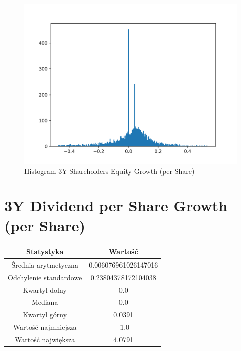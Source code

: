 \documentclass{article}
\begin{document}
\begin{figure}[h!]
    \includegraphics[width=\linewidth]{variables/3Y Shareholders Equity Growth (per Share).png}
    \caption{Histogram 3Y Shareholders Equity Growth (per Share) }
\end{figure}\section{ 3Y Dividend per Share Growth (per Share) }

\begin{center}
    \begin{tabular}{|c | c|} 
    \hline
    Statystyka & Wartość \\
    \hline\hline
    Średnia arytmetyczna & 0.006076961026147016 \\ 
    \hline
    Odchylenie standardowe & 0.23804378172104038 \\
    \hline
    Kwartyl dolny & 0.0 \\
    \hline
    Mediana & 0.0 \\
    \hline
    Kwartyl górny & 0.0391 \\
    \hline
    Wartość najmniejsza & -1.0 \\
    \hline
    Wartość największa & 4.0791 \\
    \hline
   \end{tabular}
\end{center}
\end{document}

